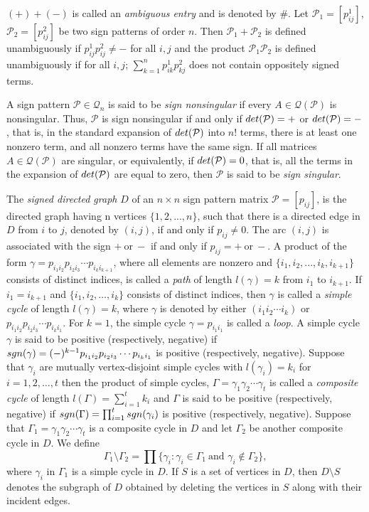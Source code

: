 \documentclass[10pt,a4paper]{amsart}
\numberwithin{equation}{section}
\def\det{{\rm det}}
\def\sgn{{\rm sgn}}
\begin{document}
	$(+)+(-)$ is called an \textit{ambiguous entry} and is denoted by \#. Let $\mathcal{P}_1=[p^1_{ij}]$, $\mathcal{P}_2=[p^2_{ij}]$ be two sign patterns of order $n$. Then $\mathcal{P}_1+\mathcal{P}_2$ is defined unambiguously if $p^1_{ij}p^2_{ij}\neq -$ for all $i,j$ and the product $\mathcal{P}_1 \mathcal{P}_2$ is defined unambiguously if for all $i,j$; $\sum_{k=1}^{n}{p^1_{ik}p^2_{kj}}$ does not contain oppositely signed terms.
	
	A sign pattern $\mathcal{P}\in \mathcal{Q}_n$ is said to be \textit{sign nonsingular} if every $A\in \mathcal{Q}(\mathcal{P})$ is nonsingular. Thus, $\mathcal{P}$ is sign nonsingular if and only if $\det(\mathcal{P})=+$ or $\det(\mathcal{P})=-$, that is, in the standard expansion of $\det(\mathcal{P})$ into $n!$ terms, there is at least one nonzero term, and all nonzero terms have the same sign.
	If all matrices $A\in \mathcal{Q(\mathcal{P})}$ are singular, or equivalently, if $\det(\mathcal{P})=0$, that is, all the terms in the expansion of $\det(\mathcal{P})$ are equal to zero, then $\mathcal{P}$ is said to be \textit{sign singular}.
	
	
	The \textit{signed directed graph} $D$ of an $n\times n$ sign pattern matrix $\mathcal{P}=[p_{ij}]$, is the directed graph having n vertices $\{1,2,...,n\}$, such that there is a directed edge in $D$ from $i$ to $j$, denoted by $(i,j)$, if and only if $p_{ij}\neq 0$. The arc $(i,j)$ is associated with the sign $+~\text{or}~-$ if and only if $p_{ij}=+~\text{or}~-$. 
	A product of the form $\gamma=p_{i_1i_2}p_{i_2i_3}\cdots p_{i_ki_{k+1}}$, where all elements are nonzero and $\{i_1,i_2,...,i_k, i_{k+1}\}$ consists of distinct indices, is called a \textit{path} of length $l(\gamma)=k$ from $i_1$ to $i_{k+1}$.
	If $i_1 = i_{k+1}$ and $\{i_1, i_2, \dots, i_k\}$ consists of distinct indices, then $\gamma$ is called a \textit{simple cycle}  of length $l(\gamma)=k$, where $\gamma$ is denoted by either $(i_1i_2\cdots i_k)$ or $p_{i_1i_2}p_{i_2i_3}\cdots p_{i_ki_{1}}$. For $k=1$, the simple cycle $\gamma=p_{i_1i_1}$ is called a \textit{loop}.
	A simple cycle $\gamma$ is said to be positive (respectively, negative) if $\sgn(\gamma)=(-)^{k-1}p_{i_1i_2}p_{i_2i_3}\cdots p_{i_ki_{1}}$ is positive (respectively, negative). 
	Suppose that $\gamma_i$ are mutually vertex-disjoint simple cycles with 
	$l(\gamma_i) = k_i$ for $i = 1, 2, \dots, t$ then the product of simple cycles, $\Gamma=\gamma_1 \gamma_2\cdots \gamma_t$ is called a \textit{composite cycle} of length $l(\Gamma)=\sum_{i=1}^{t}k_i$ and $\Gamma$ is said to be positive (respectively, negative) if $\sgn(\Gamma)=\prod_{i=1}^t\sgn(\gamma_i)$ is positive (respectively, negative). 
	Suppose that $\Gamma_1 = \gamma_1\gamma_2\cdots\gamma_t$ is a composite cycle in $D$ and let $\Gamma_2$ be another composite cycle in $D$. We define
	$$
	\Gamma_1 \setminus \Gamma_2 = \prod\{\gamma_i : \gamma_i \in \Gamma_1 ~\text{and } \gamma_i \notin \Gamma_2\},$$
	where \(\gamma_i \text{ in } \Gamma_1\) is a simple cycle in $D$.
	If $S$ is a set of vertices in $D$, then $D \setminus S$ denotes the subgraph of $ D $ obtained by deleting the vertices in $S$ along with their incident edges.
	
\end{document}
